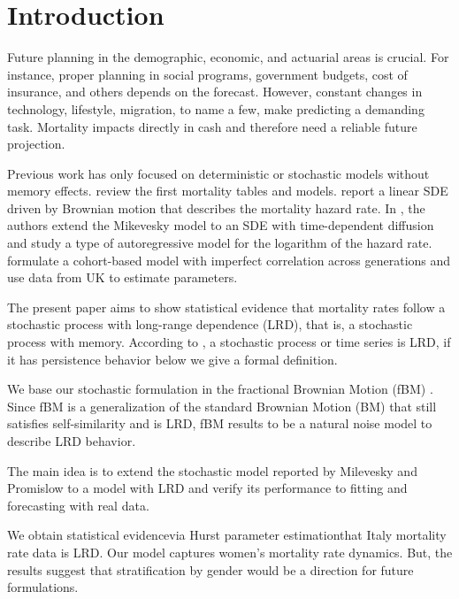 \documentclass[smallextended]{svjour3}
\begin{document}
\section{Introduction}
\label{intro}

        Future planning in the demographic, economic, and actuarial areas is
    crucial. For instance, proper planning in social programs, government
    budgets, cost of insurance, and others depends on the forecast. However,
    constant changes in technology, lifestyle, migration, to name a few, make
    predicting a demanding task.  Mortality impacts directly in cash and
    therefore need a reliable future projection.

        Previous work has only focused on deterministic or stochastic models
    without memory effects. \cite{pitacco2009modelling} review 
    the first mortality tables and models.
    \cite{mi-pr} report a linear SDE driven by Brownian motion that describes
    the mortality hazard rate. In \cite{gi-or-be}, the authors extend the
    Mikevesky model to an SDE with time-dependent diffusion and study a type of
    autoregressive model for the logarithm of the hazard rate.   
    \cite{je-lu-vi} formulate a cohort-based model with imperfect correlation
    across generations and use data from UK to estimate parameters.

        The present paper aims to show statistical evidence that mortality rates
    follow a stochastic process with long-range dependence (LRD), that is,
    a stochastic process with memory. According to \cite{ra}, a stochastic
    process or time series is LRD, if it has persistence behavior\textemdash
    below we give a formal definition.

        We base our stochastic formulation in the fractional Brownian Motion (fBM)
    \cite{ma-va}. Since fBM is a generalization of the standard Brownian Motion (BM)
    that still satisfies self-similarity and is LRD, fBM results to be a natural
    noise model to describe LRD behavior.

        The main idea is to extend the stochastic model reported by 
    Milevesky and Promislow to a model with LRD and verify its performance 
    to fitting and forecasting with real data.  

        We obtain statistical evidence\textemdash via Hurst parameter 
    estimation\textemdash that Italy mortality rate data is LRD. Our model 
    captures women's mortality rate dynamics. But, the results suggest 
    that stratification by gender would be a direction for future formulations.
   
\end{document}
